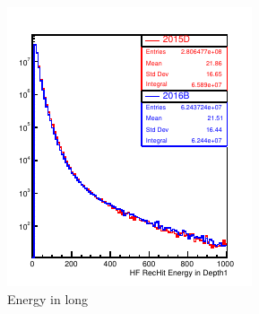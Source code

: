\begin{figure}[!h]
\begin{minipage}[b]{0.48\linewidth}
\centering
\includegraphics[width=0.99\linewidth]{../Figures/Chap2/ImageFiles_HF/BasicPics/Comp2015vs2016B/RecHitEL_2015DPUwt_2016B.pdf}
\captionsetup{width=.9\linewidth}
\caption{Energy in long}
\label{RecHitEL_2015DPUwt_2016B}
\end{minipage}
\begin{minipage}[b]{0.48\linewidth}
\centering

\end{minipage}
\end{figure}

